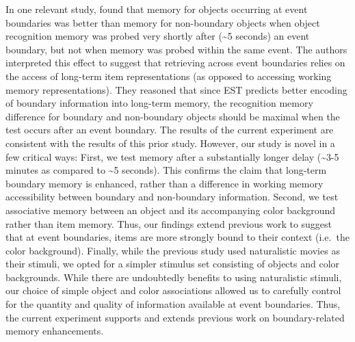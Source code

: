 In one relevant study, \textcite{swallow_event_2009} found that memory
for objects occurring at event boundaries was better than memory for
non-boundary objects when object recognition memory was probed very
shortly after (\textasciitilde{}5 seconds) an event boundary, but not
when memory was probed within the same event. The authors interpreted
this effect to suggest that retrieving across event boundaries relies on
the access of long-term item representations (as opposed to accessing
working memory representations). They reasoned that since EST predicts
better encoding of boundary information into long-term memory, the
recognition memory difference for boundary and non-boundary objects
should be maximal when the test occurs after an event boundary. The
results of the current experiment are consistent with the results of
this prior study. However, our study is novel in a few critical ways:
First, we test memory after a substantially longer delay
(\textasciitilde{}3-5 minutes as compared to \textasciitilde{}5
seconds). This confirms the claim that long-term boundary memory is
enhanced, rather than a difference in working memory accessibility
between boundary and non-boundary information. Second, we test
associative memory between an object and its accompanying color
background rather than item memory. Thus, our findings extend previous
work to suggest that at event boundaries, items are more strongly bound
to their context (i.e.~the color background). Finally, while the
previous study used naturalistic movies as their stimuli, we opted for a
simpler stimulus set consisting of objects and color backgrounds. While
there are undoubtedly benefits to using naturalistic stimuli, our choice
of simple object and color associations allowed us to carefully control
for the quantity and quality of information available at event
boundaries. Thus, the current experiment supports and extends previous
work on boundary-related memory enhancements.

